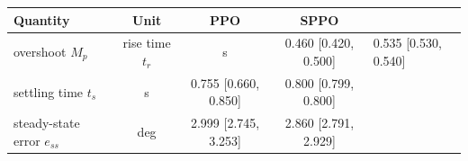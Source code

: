 \begin{tabular}{lccc}
\toprule
Quantity & Unit & PPO & SPPO \\
\midrule
overshoot $M_p$ & %
rise time $t_r$ & s & 0.460  [0.420, 0.500] & 0.535  [0.530, 0.540] \\
settling time $t_s$ & s & 0.755  [0.660, 0.850] & 0.800  [0.799, 0.800] \\
steady-state error $e_{ss}$ & deg & 2.999  [2.745, 3.253] & 2.860  [2.791, 2.929] \\
\bottomrule
\end{tabular}
